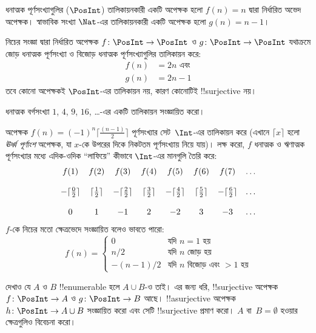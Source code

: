 \documentclass[../../../include/open-logic-section]{subfiles}
\begin{document}
\begin{ex}
ধনাত্মক পূর্ণসংখ্যাগুলির ($\PosInt$) তালিকায়নকারী একটি অপেক্ষক হলো $f(n) = n$ দ্বারা নির্ধারিত অভেদ অপেক্ষক। স্বাভাবিক সংখ্যা $\Nat$-এর তালিকায়নকারী একটি অপেক্ষক হলো $g(n) = n - 1$।
\end{ex}

\begin{ex}
নিচের সংজ্ঞা দ্বারা নির্ধারিত অপেক্ষক $f\colon \PosInt \to \PosInt$ ও $g \colon \PosInt \to
\PosInt$ যথাক্রমে জোড় ধনাত্মক পূর্ণসংখ্যা ও বিজোড় ধনাত্মক পূর্ণসংখ্যাগুলির তালিকায়ন করে:
\begin{align*}
f(n) & = 2n \text{ এবং}\\
g(n) & = 2n - 1
\end{align*}
তবে কোনো অপেক্ষকই $\PosInt$-এর তালিকায়ন নয়, কারণ কোনোটিই !!{surjective} নয়।
\end{ex}

\begin{prob}
ধনাত্মক বর্গসংখ্যা $1$, $4$, $9$, $16$, \dots{}-এর একটি তালিকায়ন সংজ্ঞায়িত করো।
\end{prob}

\begin{ex}
অপেক্ষক $f(n) = (-1)^{n} \lceil \frac{(n-1)}{2}\rceil$ পূর্ণসংখ্যার সেট~$\Int$-এর তালিকায়ন করে (এখানে $\lceil x \rceil$ হলো \emph{ঊর্ধ্ব পূর্ণাংশ} অপেক্ষক, যা $x$-কে উপরের দিকে নিকটতম পূর্ণসংখ্যায় নিয়ে যায়)। লক্ষ করো, $f$ ধনাত্মক ও ঋণাত্মক পূর্ণসংখ্যার মধ্যে এদিক-ওদিক ``লাফিয়ে'' কীভাবে $\Int$-এর মানগুলি তৈরি করে:
\[
\begin{array}{c c c c c c c c}
f(1) & f(2) & f(3) & f(4) & f(5) & f(6) & f(7) & \dots \\ \\
- \lceil \tfrac{0}{2} \rceil & \lceil \tfrac{1}{2}\rceil & - \lceil \tfrac{2}{2} \rceil & \lceil \tfrac{3}{2} \rceil & - \lceil \tfrac{4}{2} \rceil  & \lceil \tfrac{5}{2}
\rceil & - \lceil \tfrac{6}{2} \rceil & \dots \\ \\
0 & 1 & -1 & 2 & -2 & 3 & -3 & \dots
\end{array}
\] 
$f$-কে নিচের মতো ক্ষেত্রভেদে সংজ্ঞায়িত বলেও ভাবতে পারো:
\[
f(n) = \begin{cases}
  0 & \text{যদি $n = 1$ হয়}\\
  n/2 & \text{যদি $n$ জোড় হয়}\\
  -(n-1)/2 & \text{যদি $n$ বিজোড় এবং $>1$ হয়}
  \end{cases}
\]
\end{ex}

\begin{prob}
  দেখাও যে $A$ ও $B$ !!{enumerable} হলে $A \cup B$-ও তাই। এর জন্য ধরি, !!{surjective} অপেক্ষক $f\colon \PosInt \to
  A$ ও $g\colon \PosInt \to B$ আছে। !!a{surjective} অপেক্ষক~$h\colon \PosInt \to A \cup B$ সংজ্ঞায়িত করো এবং সেটি !!{surjective} প্রমাণ করো। $A$ বা~$B = \emptyset$ হওয়ার ক্ষেত্রগুলিও বিবেচনা করো।
\end{prob}
\end{document}
